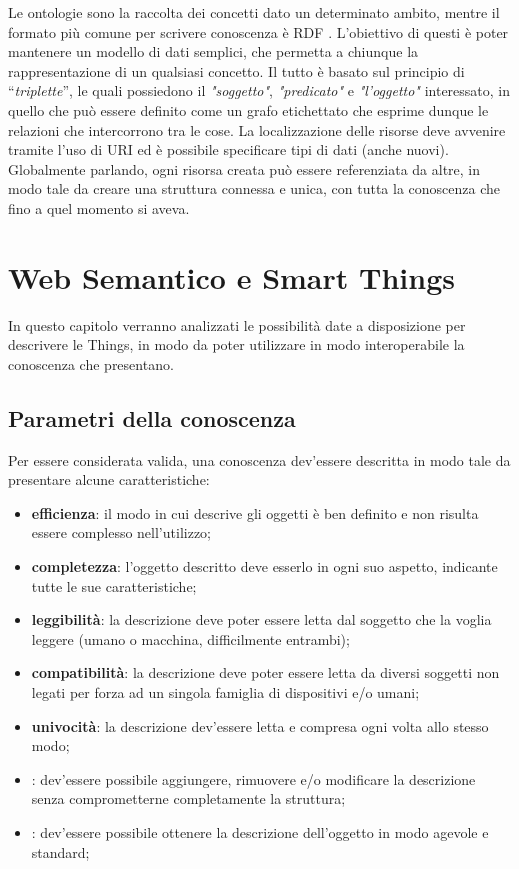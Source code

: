 \documentclass[12pt,a4paper,openright,oneside]{report}
\newcommand{\quotes}[1]{``#1''}
\begin{document}
Le ontologie \cite{ontology} sono la raccolta dei concetti dato un determinato ambito, mentre il formato più comune per scrivere conoscenza è RDF \cite{rdf}. L'obiettivo di questi è poter mantenere un modello di dati semplici, che permetta a chiunque la rappresentazione di un qualsiasi concetto. Il tutto è basato sul principio di \quotes{\textit{triplette}}, le quali possiedono il \textit{"soggetto"}, \textit{"predicato"} e \textit{"l'oggetto"} interessato, in quello che può essere definito come un grafo etichettato che esprime dunque le relazioni che intercorrono tra le cose. La localizzazione delle risorse deve avvenire tramite l'uso di URI ed è possibile specificare tipi di dati (anche nuovi). Globalmente parlando, ogni risorsa creata può essere referenziata da altre, in modo tale da creare una struttura connessa e unica, con tutta la conoscenza che fino a quel momento si aveva.


\clearpage{\pagestyle{empty}\cleardoublepage}
\chapter{Web Semantico e Smart Things}           %
\lhead[\fancyplain{}{\bfseries\thepage}]{\fancyplain{}{\bfseries\rightmark}}  
In questo capitolo verranno analizzati le possibilità date a disposizione per descrivere le Things, in modo da poter utilizzare in modo interoperabile la conoscenza che presentano.


\section{Parametri della conoscenza}
Per essere considerata valida, una conoscenza dev'essere descritta in modo tale da presentare alcune caratteristiche:

\begin{itemize}
	\item \textbf{efficienza}: il modo in cui descrive gli oggetti è ben definito e non risulta essere complesso nell'utilizzo;
	\item \textbf{completezza}: l'oggetto descritto deve esserlo in ogni suo aspetto, indicante tutte le sue caratteristiche;
	\item \textbf{leggibilità}: la descrizione deve poter essere letta dal soggetto che la voglia leggere (umano o macchina, difficilmente entrambi);
	\item \textbf{compatibilità}: la descrizione deve poter essere letta da diversi soggetti non legati per forza ad un singola famiglia di dispositivi e/o umani;
	\item \textbf{univocità}: la descrizione dev'essere letta e compresa ogni volta allo stesso modo;
	\item {}: dev'essere possibile aggiungere, rimuovere e/o modificare la descrizione senza comprometterne completamente la struttura;
	\item {}: dev'essere possibile ottenere la descrizione dell'oggetto in modo agevole e standard;
\end{itemize}
\end{document}
